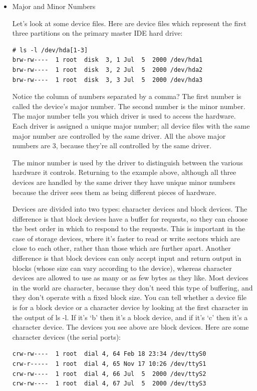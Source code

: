 \documentclass[11pt]{article}
\begin{document}
\begin{itemize}
\item Major and Minor Numbers
\label{sec:org4b5efb6}

Let's look at some device files. Here are device files which represent the first three partitions on the primary master IDE hard drive:

\begin{verbatim}
# ls -l /dev/hda[1-3]
brw-rw----  1 root  disk  3, 1 Jul  5  2000 /dev/hda1
brw-rw----  1 root  disk  3, 2 Jul  5  2000 /dev/hda2
brw-rw----  1 root  disk  3, 3 Jul  5  2000 /dev/hda3
\end{verbatim}

Notice the column of numbers separated by a comma? The first number is called the device's major number. The second number is the minor number. The major number tells you which driver is used to access the hardware. Each driver is assigned a unique major number; all device files with the same major number are controlled by the same driver. All the above major numbers are 3, because they're all controlled by the same driver.

The minor number is used by the driver to distinguish between the various hardware it controls. Returning to the example above, although all three devices are handled by the same driver they have unique minor numbers because the driver sees them as being different pieces of hardware.

Devices are divided into two types: character devices and block devices. The difference is that block devices have a buffer for requests, so they can choose the best order in which to respond to the requests. This is important in the case of storage devices, where it's faster to read or write sectors which are close to each other, rather than those which are further apart. Another difference is that block devices can only accept input and return output in blocks (whose size can vary according to the device), whereas character devices are allowed to use as many or as few bytes as they like. Most devices in the world are character, because they don't need this type of buffering, and they don't operate with a fixed block size. You can tell whether a device file is for a block device or a character device by looking at the first character in the output of ls -l. If it's `b' then it's a block device, and if it's `c' then it's a character device. The devices you see above are block devices. Here are some character devices (the serial ports):

\begin{verbatim}
crw-rw----  1 root  dial 4, 64 Feb 18 23:34 /dev/ttyS0
crw-r-----  1 root  dial 4, 65 Nov 17 10:26 /dev/ttyS1
crw-rw----  1 root  dial 4, 66 Jul  5  2000 /dev/ttyS2
crw-rw----  1 root  dial 4, 67 Jul  5  2000 /dev/ttyS3
\end{verbatim}


\end{itemize}
\end{document}

